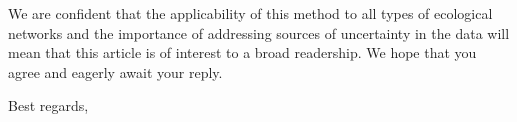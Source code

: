 \documentclass[12pt]{letter}
\begin{document}
\begin{letter}
    
    We are confident that the applicability of this method to all types of ecological networks and the importance of addressing sources of uncertainty in the data will mean that this article is of interest to a broad readership. We hope that you agree and eagerly await your reply.



\closing{Best regards,}


\end{letter}
\end{document}
